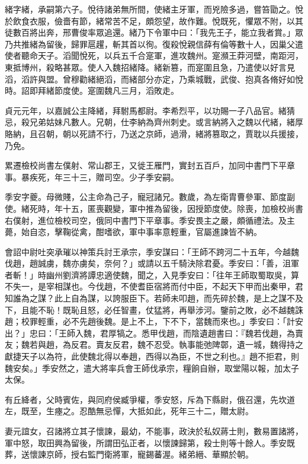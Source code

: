 \begin{pinyinscope}
 緒字緒，承嗣第六子。悅待諸弟無所間，使緒主牙軍，而兇險多過，嘗笞勖之。悅於飲食衣服，儉嗇有節，緒常苦不足，頗怨望，故作難。悅既死，懼眾不附，以其徒數百將出奔，邢曹俊率眾追還。緒乃下令軍中曰：「我先王子，能立我者賞。」眾乃共推緒為留後，歸罪扈趯，斬其首以徇。復殺悅親信薛有倫等數十人，因巢父遣使者聽命天子。滔聞悅死，以兵五千合寔軍，進攻魏州。寔瀕王莽河壁，南距河，東抵博州，殺略甚眾。使人入魏招緒降。緒新篡，而寔圍且急，乃遣使以好言見滔，滔許與盟。曾穆勸緒絕滔，而緒部分亦定，乃乘城戰，武俊、抱真各脩好如悅時。詔即拜緒節度使。寔圍魏凡三月，滔敗走。



 貞元元年，以嘉誠公主降緒，拜駙馬都尉。李希烈平，以功賜一子八品官。緒猜忌，殺兄弟姑妹凡數人。兄朝，仕李納為齊州刺史。或言納將入之魏以代緒，緒厚賂納，且召朝，朝以死請不行，乃送之京師，過滑，緒將篡取之，賈耽以兵援接，乃免。



 累遷檢校尚書左僕射、常山郡王，又徙王雁門，實封五百戶，加同中書門下平章事。暴疾死，年三十三，贈司空。少子季安嗣。



 季安字夔。母微賤，公主命為己子，寵冠諸兄。數歲，為左衛胄曹參軍、節度副使。緒死時，年十五，匿喪觀變，軍中推為留後，因授節度使。除喪，加檢校尚書右僕射，進位檢校司空，俄同中書門下平章事。季安畏主之嚴，頗循禮法。及主薨，始自恣，擊鞠從禽，酣嗜欲，軍中事率意輕重，官屬進諫皆不納。



 會詔中尉吐突承璀以神策兵討王承宗，季安謀曰：「王師不跨河二十五年，今越魏伐趙，趙誠虜，魏亦虜矣，奈何？」或請以五千騎決除君憂。季安曰：「善，沮軍者斬！」時幽州劉濟將譚忠適使魏，聞之，入見季安曰：「往年王師取蜀取吳，算不失一，是宰相謀也。今伐趙，不使耆臣宿將而付中臣，不起天下甲而出秦甲，君知誰為之謀？此上自為謀，以誇服臣下。若師未叩趙，而先碎於魏，是上之謀不及下，且能不恥！既恥且怒，必任智畫，仗猛將，再舉涉河。鑒前之敗，必不越魏誅趙；校罪輕重，必不先趙後魏。是上不上，下不下，當魏而來也。」季安曰：「計安出？」忠曰：「王師入魏，君厚犒之。悉甲伐趙，而陰遺趙書曰：『魏若伐趙，為賣友；魏若與趙，為反君。賣友反君，魏不忍受。執事能弛陴鄣，遺一城，魏得持之獻捷天子以為符，此使魏北得以奉趙，西得以為臣，不世之利也。』趙不拒君，則魏安矣。」季安然之，遣大將率兵會王師伐承宗，糧餉自辦，取堂陽以報，加太子太保。



 有丘絳者，父時賓佐，與同府侯臧爭權，季安怒，斥為下縣尉，俄召還，先坎道左，既至，生瘞之。忍酷無忌憚，大抵如此，死年三十二，贈太尉。



 妻元誼女，召諸將立其子懷諫，最幼，不能事，政決於私奴蔣士則，數易置諸將，軍中怒，取田興為留後，所謂田弘正者，以懷諫歸第，殺士則等十餘人。季安既葬，送懷諫京師，授右監門衛將軍，寵錫蕃渥。緒弟縉、華顯於朝。




\end{pinyinscope}
